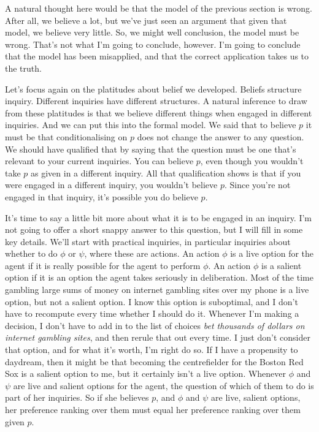 A natural thought here would be that the model of the previous section is wrong. After all, we believe a lot, but we've just seen an argument that given that model, we believe very little. So, we might well conclusion, the model must be wrong. That's not what I'm going to conclude, however. I'm going to conclude that the model has been misapplied, and that the correct application takes us to the truth.

Let's focus again on the platitudes about belief we developed. Beliefs structure inquiry. Different inquiries have different structures. A natural inference to draw from these platitudes is that we believe different things when engaged in different inquiries. And we can put this into the formal model. We said that to believe \(p\) it must be that conditionalising on \(p\) does not change the answer to any question. We should have qualified that by saying that the question must be one that's relevant to your current inquiries. You can believe \(p\), even though you wouldn't take \(p\) as given in a different inquiry. All that qualification shows is that if you were engaged in a different inquiry, you wouldn't believe \(p\). Since you're not engaged in that inquiry, it's possible you do believe \(p\).

It's time to say a little bit more about what it is to be engaged in an inquiry. I'm not going to offer a short snappy answer to this question, but I will fill in some key details. We'll start with practical inquiries, in particular inquiries about whether to do \(\phi\) or \(\psi\), where these are actions. An action \(\phi\) is a live option for the agent if it is really possible for the agent to perform \(\phi\). An action \(\phi\) is a salient option if it is an option the agent takes seriously in deliberation. Most of the time gambling large sums of money on internet gambling sites over my phone is a live option, but not a salient option. I know this option is suboptimal, and I don't have to recompute every time whether I should do it. Whenever I'm making a decision, I don't have to add in to the list of choices \textit{bet thousands of dollars on internet gambling sites}, and then rerule that out every time. I just don't consider that option, and for what it's worth, I'm right do so. If I have a propensity to daydream, then it might be that becoming the centrefielder for the Boston Red Sox is a salient option to me, but it certainly isn't a live option. Whenever \(\phi\) and \(\psi\) are live and salient options for the agent, the question of which of them to do is part of her inquiries. So if she believes \(p\), and \(\phi\) and \(\psi\) are live, salient options, her preference ranking over them must equal her preference ranking over them given \(p\).

